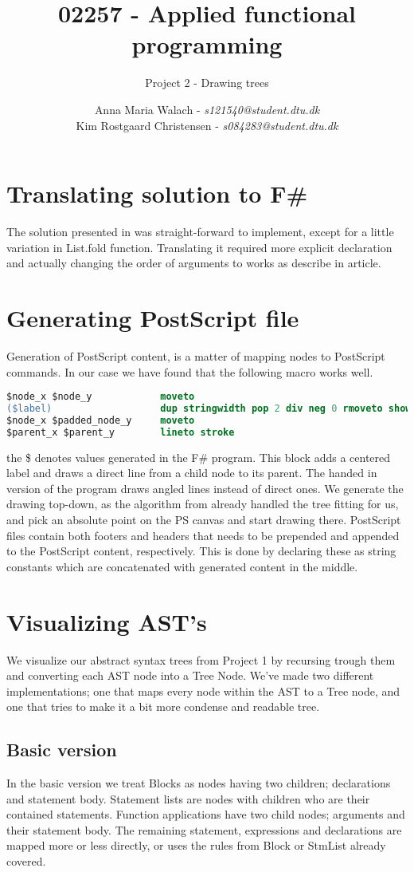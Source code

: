 \documentclass[10pt]{scrartcl}
\title{02257 - Applied functional programming}
\subtitle{Project 2 - Drawing trees}
\author{Anna Maria Walach - \textit {s121540@student.dtu.dk} \\ Kim Rostgaard Christensen - \textit {s084283@student.dtu.dk}}
\begin{document}
\maketitle
\section{Translating solution to F\#}
The solution presented in \cite{kennedy1996functional} was straight-forward to implement, except for a little variation in List.fold function. Translating it required more explicit declaration and actually changing the order of arguments to works as describe in article.
\section{Generating PostScript file}
Generation of PostScript content, is a matter of mapping nodes to PostScript commands. In our case we have found that the following macro works well.
\begin{lstlisting}[language=PostScript]
$node_x $node_y            moveto
($label)                   dup stringwidth pop 2 div neg 0 rmoveto show
$node_x $padded_node_y     moveto
$parent_x $parent_y        lineto stroke
\end{lstlisting}
the \$ denotes values generated in the F\# program. This block adds a centered label and draws a direct line from a child node to its parent. The handed in version of the program draws angled lines instead of direct ones.
We generate the drawing top-down, as the algorithm from \cite{kennedy1996functional} already handled the tree fitting for us, and pick an absolute point on the PS canvas and start drawing there.
PostScript files contain both footers and headers that needs to be prepended and appended to the PostScript content, respectively. This is done by declaring these as string constants which are concatenated with generated content in the middle.
\section{Visualizing AST's}
We visualize our abstract syntax trees from Project 1 by recursing trough them and converting each AST node into a Tree Node. We've made two different implementations; one that maps every node within the AST to a Tree node, and one that tries to make it a bit more condense and readable tree. 
\subsection{Basic version}
In the basic version we treat Blocks as nodes having two children; declarations and statement body. Statement lists are nodes with children who are their contained statements. Function applications have two child nodes; arguments and their statement body. The remaining statement, expressions and declarations are mapped more or less directly, or uses the rules from Block or StmList already covered.
\end{document}
